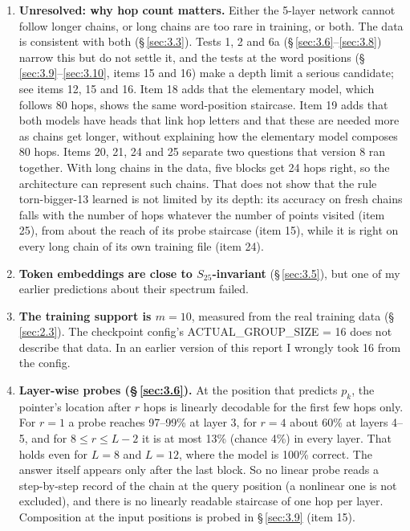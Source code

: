 \documentclass[paper=a4,fontsize=11pt,DIV=11,parskip=half,headings=small,numbers=noendperiod]{scrartcl}
\DeclareRobustCommand{\lead}[1]{\textsf{\bfseries\color{accent}#1}}
\DeclareRobustCommand{\code}[1]{{\fontseries{m}\ttfamily #1}}
\begin{document}
\begin{enumerate}
\item \lead{Unresolved: why hop count matters.} Either the 5-layer network cannot follow longer chains, or long
  chains are too rare in training, or both. The data is consistent with both (\S\,\ref{sec:3.3}). Tests 1, 2 and
  6a (\S\,\ref{sec:3.6}–\ref{sec:3.8}) narrow this but do not settle it, and the tests at the word positions
  (\S\,\ref{sec:3.9}–\ref{sec:3.10}, items 15 and 16) make a depth limit a serious candidate; see items 12, 15
  and 16. Item 18 adds that the elementary model, which follows 80 hops, shows the same word-position staircase.
  Item 19 adds that both models have heads that link hop letters and that these are needed more as chains get
  longer, without explaining how the elementary model composes 80 hops. Items 20, 21, 24 and 25 separate two
  questions that version 8 ran together. With long chains in the data, five blocks get 24 hops right, so the
  architecture can represent such chains. That does not show that the rule
  \code{torn-\allowbreak{}bigger-\allowbreak{}13} learned is not limited by its depth: its accuracy on fresh
  chains falls with the number of hops whatever the number of points visited (item 25), from about the reach of
  its probe staircase (item 15), while it is right on every long chain of its own training file (item 24).
\item \lead{Token embeddings are close to $S_{25}$-invariant} (\S\,\ref{sec:3.5}), but one of my earlier
  predictions about their spectrum failed.
\item \lead{The training support is $m=10$}, measured from the real training data (\S\,\ref{sec:2.3}). The
  checkpoint config’s \code{ACTUAL\_\allowbreak{}GROUP\_\allowbreak{}SIZE = 16} does not describe that data. In
  an earlier version of this report I wrongly took 16 from the config.
\item \lead{Layer-wise probes (\S\,\ref{sec:3.6}).} At the position that predicts $p_k$, the pointer’s location
  after $r$ hops is linearly decodable for the first few hops only. For $r=1$ a probe reaches 97–99\% at layer
  3, for $r=4$ about 60\% at layers 4–5, and for $8\le r\le L-2$ it is at most 13\% (chance 4\%) in every layer.
  That holds even for $L=8$ and $L=12$, where the model is 100\% correct. The answer itself appears only after
  the last block. So no linear probe reads a step-by-step record of the chain at the query position (a nonlinear
  one is not excluded), and there is no linearly readable staircase of one hop per layer. Composition at the
  input positions is probed in \S\,\ref{sec:3.9} (item 15).

\end{enumerate}
\end{document}
